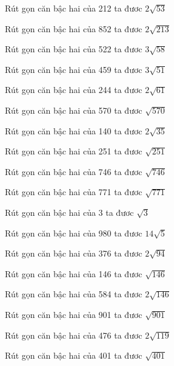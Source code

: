 \documentclass[12pt,a4paper]{article}
\begin{document}
\begin{ex}
Rút gọn căn bậc hai của 212 ta đươc $2\sqrt{53}$
\end{ex}
\begin{ex}
Rút gọn căn bậc hai của 852 ta đươc $2\sqrt{213}$
\end{ex}
\begin{ex}
Rút gọn căn bậc hai của 522 ta đươc $3\sqrt{58}$
\end{ex}
\begin{ex}
Rút gọn căn bậc hai của 459 ta đươc $3\sqrt{51}$
\end{ex}
\begin{ex}
Rút gọn căn bậc hai của 244 ta đươc $2\sqrt{61}$
\end{ex}
\begin{ex}
Rút gọn căn bậc hai của 570 ta đươc $\sqrt{570}$
\end{ex}
\begin{ex}
Rút gọn căn bậc hai của 140 ta đươc $2\sqrt{35}$
\end{ex}
\begin{ex}
Rút gọn căn bậc hai của 251 ta đươc $\sqrt{251}$
\end{ex}
\begin{ex}
Rút gọn căn bậc hai của 746 ta đươc $\sqrt{746}$
\end{ex}
\begin{ex}
Rút gọn căn bậc hai của 771 ta đươc $\sqrt{771}$
\end{ex}
\begin{ex}
Rút gọn căn bậc hai của 3 ta đươc $\sqrt{3}$
\end{ex}
\begin{ex}
Rút gọn căn bậc hai của 980 ta đươc $14\sqrt{5}$
\end{ex}
\begin{ex}
Rút gọn căn bậc hai của 376 ta đươc $2\sqrt{94}$
\end{ex}
\begin{ex}
Rút gọn căn bậc hai của 146 ta đươc $\sqrt{146}$
\end{ex}
\begin{ex}
Rút gọn căn bậc hai của 584 ta đươc $2\sqrt{146}$
\end{ex}
\begin{ex}
Rút gọn căn bậc hai của 901 ta đươc $\sqrt{901}$
\end{ex}
\begin{ex}
Rút gọn căn bậc hai của 476 ta đươc $2\sqrt{119}$
\end{ex}
\begin{ex}
Rút gọn căn bậc hai của 401 ta đươc $\sqrt{401}$
\end{ex}
\end{document}
